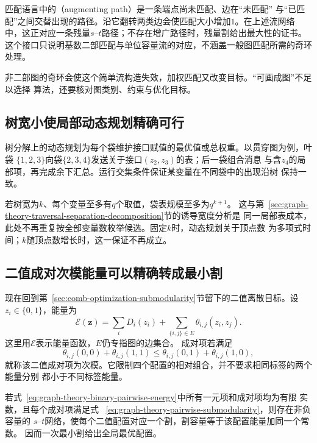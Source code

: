 匹配语言中的（augmenting path）是一条端点尚未匹配、边在“未匹配”
与“已匹配”之间交替出现的路径。沿它翻转两类边会使匹配大小增加\(1\)。在上述流网络
中，这正对应一条残量\(s\)--\(t\)路径；不存在增广路径时，残量割给出最大性的证书。
这个接口只说明基数二部匹配与单位容量流的对应，不涵盖一般图匹配所需的奇环处理。

非二部图的奇环会使这个简单流构造失效，加权匹配又改变目标。“可画成图”不足以选择
算法，还要核对图类别、约束与优化目标。

\subsection{树宽小使局部动态规划精确可行}

树分解上的动态规划为每个袋维护接口赋值的最优值或总权重。以贯穿图为例，叶袋
\(\{1,2,3\}\)向袋\(\{2,3,4\}\)发送关于接口\((z_2,z_3)\)的表；后一袋组合消息
与含\(z_4\)的局部项，再完成余下汇总。运行交集条件保证某变量在不同袋中的出现沿树
保持一致。

若树宽为\(k\)、每个变量至多有\(q\)个取值，袋表规模至多为\(q^{k+1}\)。
这与第~\ref{sec:graph-theory-traversal-separation-decomposition}节的诱导宽度分析是
同一局部表成本，此处不再重复按全部变量数枚举候选。固定\(k\)时，动态规划关于顶点数
为多项式时间；\(k\)随顶点数增长时，这一保证不再成立。

\subsection{二值成对次模能量可以精确转成最小割}

现在回到第~\ref{sec:comb-optimization-submodularity}节留下的二值离散目标。设
\(z_i\in\{0,1\}\)，能量为
\begin{equation}
  \mathcal{E}(\bm{z})=\sum_i D_i(z_i)+
  \sum_{\{i,j\}\in E}\theta_{i,j}(z_i,z_j).
  \label{eq:graph-theory-binary-pairwise-energy}
\end{equation}
这里用\(\mathcal{E}\)表示能量函数，\(E\)仍专指图的边集合。
成对项若满足
\begin{equation}
  \theta_{i,j}(0,0)+\theta_{i,j}(1,1)
  \leq
  \theta_{i,j}(0,1)+\theta_{i,j}(1,0),
  \label{eq:graph-theory-pairwise-submodularity}
\end{equation}
就称该二值成对项为次模。它限制四个配置的相对组合，并不要求相同标签的两个能量分别
都小于不同标签能量。

\begin{theorem}[二值次模成对能量的割表示]
  \label{thm:graph-theory-submodular-cut-representation}
  若式~\eqref{eq:graph-theory-binary-pairwise-energy}中所有一元项和成对项均为有限
  实数，且每个成对项满足式
  ~\eqref{eq:graph-theory-pairwise-submodularity}，则存在非负容量的
  \(s\)--\(t\)网络，使每个二值配置对应一个割，割容量等于该配置能量加同一个常数。
  因而一次最小割给出全局最优配置。
\end{theorem}

